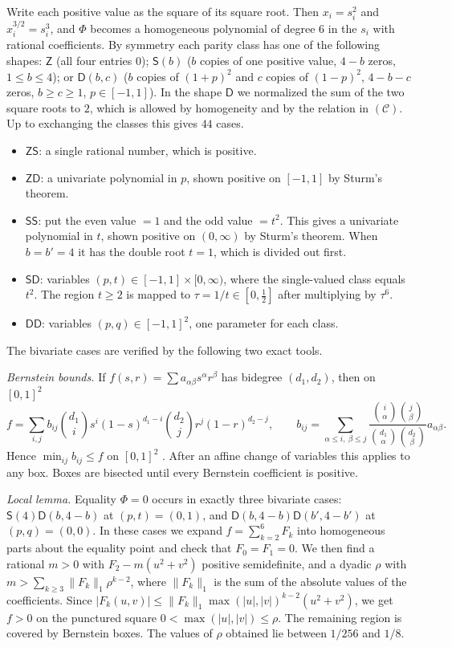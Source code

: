 \documentclass[11pt]{article}
\theoremstyle{remark}
\numberwithin{equation}{section}
\begin{document}
Write each positive value as the square of its square root. Then $x_i=s_i^2$ and
$x_i^{3/2}=s_i^3$, and $\Phi$ becomes a homogeneous polynomial of degree $6$ in the
$s_i$ with rational coefficients. By symmetry each parity class has one of the following
shapes: $\mathsf Z$ (all four entries $0$); $\mathsf S(b)$ ($b$ copies of one positive value,
$4-b$ zeros, $1\le b\le4$); or $\mathsf D(b,c)$ ($b$ copies of $(1+p)^2$ and $c$ copies of
$(1-p)^2$, $4-b-c$ zeros, $b\ge c\ge1$, $p\in[-1,1]$). In the shape $\mathsf D$ we normalized the
sum of the two square roots to $2$, which is allowed by homogeneity and by the relation in
$(\mathcal C)$. Up to exchanging the classes this gives $44$ cases.
\begin{itemize}
\item $\mathsf Z\mathsf S$: a single rational number, which is positive.
\item $\mathsf Z\mathsf D$: a univariate polynomial in $p$, shown positive on $[-1,1]$ by Sturm's theorem.
\item $\mathsf S\mathsf S$: put the even value $=1$ and the odd value $=t^2$. This gives a
univariate polynomial in $t$, shown positive on $(0,\infty)$ by Sturm's theorem. When $b=b'=4$
it has the double root $t=1$, which is divided out first.
\item $\mathsf S\mathsf D$: variables $(p,t)\in[-1,1]\times[0,\infty)$, where the
single-valued class equals $t^2$. The region $t\ge2$ is mapped to $\tau=1/t\in[0,\frac12]$
after multiplying by $\tau^6$.
\item $\mathsf D\mathsf D$: variables $(p,q)\in[-1,1]^2$, one parameter for each class.
\end{itemize}

The bivariate cases are verified by the following two exact tools.

\emph{Bernstein bounds.} If $f(s,r)=\sum a_{\alpha\beta}s^\alpha r^\beta$ has bidegree
$(d_1,d_2)$, then on $[0,1]^2$
\[
f=\sum_{i,j}b_{ij}\binom{d_1}{i}s^i(1-s)^{d_1-i}\binom{d_2}{j}r^j(1-r)^{d_2-j},\qquad
b_{ij}=\sum_{\alpha\le i,\ \beta\le j}\frac{\binom i\alpha\binom j\beta}{\binom{d_1}\alpha\binom{d_2}\beta}a_{\alpha\beta}.
\]
Hence $\min_{ij}b_{ij}\le f$ on $[0,1]^2$ \cite{Far}. After an affine change of variables this
applies to any box. Boxes are bisected until every Bernstein coefficient is positive.

\emph{Local lemma.} Equality $\Phi=0$ occurs in exactly three bivariate cases:
$\mathsf S(4)\mathsf D(b,4-b)$ at $(p,t)=(0,1)$, and $\mathsf D(b,4-b)\mathsf D(b',4-b')$ at
$(p,q)=(0,0)$. In these cases we expand $f=\sum_{k=2}^6F_k$ into homogeneous parts about the
equality point and check that $F_0=F_1=0$. We then find a rational $m>0$ with
$F_2-m(u^2+v^2)$ positive semidefinite, and a dyadic $\rho$ with
$m>\sum_{k\ge3}\|F_k\|_1\rho^{k-2}$, where $\|F_k\|_1$ is the sum of the absolute values of the
coefficients. Since $|F_k(u,v)|\le\|F_k\|_1\max(|u|,|v|)^{k-2}(u^2+v^2)$, we get $f>0$ on the
punctured square $0<\max(|u|,|v|)\le\rho$. The remaining region is covered by Bernstein boxes.
The values of $\rho$ obtained lie between $1/256$ and $1/8$.
\end{document}
